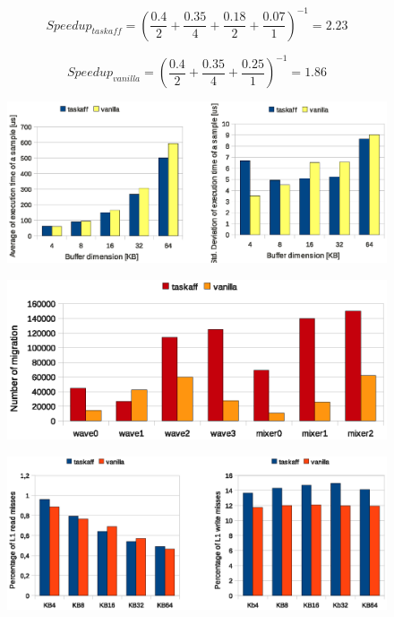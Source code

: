 \begin{equation}
  Speedup_{taskaff} = \left( \frac{0.4}{2} + \frac{0.35}{4} + \frac{0.18}{2} + \frac{0.07}{1}\right)^{-1} = 2.23
\label{eq:speedup_xeon_taskaff}
\end{equation}

\begin{equation}
  Speedup_{vanilla} = \left(\frac{0.4}{2} + \frac{0.35}{4} + \frac{0.25}{1} \right)^{-1} = 1.86
\label{eq:speedup_xeon_van}
\end{equation}

\begin{figure}[htbp]
\centering
\includegraphics[width=\widefigure]{images/results_xeon/time_avg_var_Xeon.eps}
\caption{}
\label{fig:time_avg_var_xeon}
\end{figure}

\begin{figure}[htbp]
\centering
\includegraphics[width=\widefigure]{images/results_xeon/migration_xeon.eps}
\caption{}
\label{fig:migration_xeon}
\end{figure}

\begin{figure}[htbp]
\centering
\includegraphics[width=\widefigure]{images/results_xeon/l1_load_store_xeon.eps}
\caption{}
\label{fig:l1_load_store_xeon}
\end{figure}

